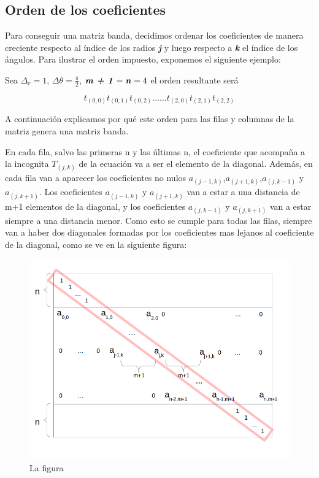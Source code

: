
\subsection{Orden de los coeficientes}


Para conseguir una matriz banda, decidimos ordenar los coeficientes de manera creciente respecto al índice de los radios \textbf{\textit{j}} y luego respecto a \textbf{\textit{k}} el índice de los ángulos. Para ilustrar el orden impuesto, exponemos el siguiente ejemplo:

Sea $\Delta_{r} = 1$,  $\Delta{\theta} = \frac{\pi}{2}$, $\textbf{\textit{m + 1}} = \textbf{\textit{n}} = 4$ el orden resultante será 

$$ t_{(0,0)} t_{(0,1)} t_{(0,2)} ...... t_{(2,0)} t_{(2,1)} t_{(2,2)} $$


A continuación explicamos por qué este orden para las filas y columnas de la matriz genera una matriz banda.

En cada fila, salvo las primeras n y las últimas n, el coeficiente que acompaña a la incognita $T_{(j,k)}$ de la ecuación va a ser el elemento de la diagonal. Además, en cada fila van a aparecer los coeficientes no nulos $a_{(j-1,k)}$,$a_{(j+1,k)}$,$a_{(j,k-1)}$ y $a_{(j,k+1)}$.
Los coeficientes $a_{(j-1,k)}$ y $a_{(j+1,k)}$ van a estar a una distancia de m+1 elementos de la diagonal, y los coeficientes $a_{(j,k-1)}$ y $a_{(j,k+1)}$ van a estar siempre a una distancia menor. Como esto se cumple para todas las filas, siempre van a haber dos diagonales formadas por los coeficientes mas lejanos al coeficiente de la diagonal, como se ve en la siguiente figura:

\begin{figure}[h]
  \includegraphics[scale=0.4]{imagenes/figura1.png}
  \caption{La figura}
  \label{fig:corteHorno}
\end{figure}

